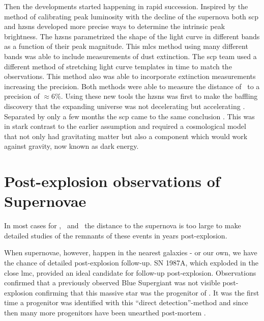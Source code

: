 Then the developments started happening in rapid succession.  Inspired by the method of calibrating peak luminosity with the decline of the supernova both \gls{scp} and \gls{hzsns} developed more precise ways to determine the intrinsic peak brightness. The \gls{hzsns} parametrized the shape of the light curve  in different bands as a function of their peak magnitude. This \gls{mlcs} method using many different bands was able to include measurements of dust extinction. The \gls{scp} team used a different method of stretching light curve templates in time to match the observations. This method also was able to incorporate extinction measurements increasing the precision. Both methods were able to measure the distance of \sneia\ to a precision of $\approx6\%$. Using these new tools the \gls{hzsns} was first to make the baffling discovery that the expanding universe was not decelerating but accelerating \citep{1998AJ....116.1009R}. Separated by only a few months the \gls{scp} came to the same conclusion \citep{1999ApJ...517..565P}. This was in stark contrast to the earlier assumption and required a cosmological model that not only had gravitating matter but also a component which would work against gravity, now known as dark energy.


\section{Post-explosion observations of Supernovae}

In most cases for \sneia, \sneibc\ and \sneii\ the distance to the supernova is too large to make detailed studies of the remnants of these events in years post-explosion.

When supernovae, however, happen in the nearest galaxies - or our own, we have the chance of detailed post-explosion follow-up.
SN 1987A, which exploded in the close \gls{lmc}, provided an ideal candidate for follow-up post-explosion. Observations confirmed that a previously observed Blue Supergiant was not visible post-explosion \citep{1989A&A...219..229W} confirming that this massive star was the progenitor of . It was the first time a progenitor was identified with this ``direct detection''-method and since then many more progenitors have been unearthed post-mortem \citep[for a review see][]{2009ARA&A..47...63S}.

